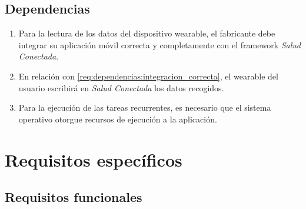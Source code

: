     \subsection{Dependencias}
        \label{req:descripcion:dependencias}
    
        \begin{enumerate}[label=\textbf{DEP-\arabic*}]
            \item \label{req:dependencias:integracion_correcta} Para la lectura de los datos del dispositivo \gls{wearable}, el fabricante debe integrar su aplicación móvil correcta y completamente con el \gls{framework} \textit{Salud Conectada}.
            \item En relación con \ref{req:dependencias:integracion_correcta}, el \gls{wearable} del usuario escribirá en \textit{Salud Conectada} los datos recogidos.
            \item \label{req:dependencias:planificacion} Para la ejecución de las tareas recurrentes, es necesario que el sistema operativo otorgue recursos de ejecución a la aplicación.
        \end{enumerate}

\section{Requisitos específicos}
    \label{req:especificos}

    \subsection{Requisitos funcionales}
        \label{req:especificos:funcionales}




